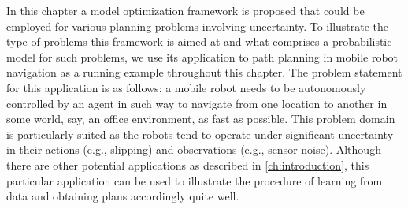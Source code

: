 
In this chapter a model optimization framework is proposed that could be employed for various planning problems involving uncertainty.
To illustrate the type of problems this framework is aimed at and what comprises a probabilistic model for such problems, we use its application to path planning in mobile robot navigation as a running example throughout this chapter.
The problem statement for this application is as follows: a mobile robot needs to be autonomously controlled by an agent in such way to navigate from one location to another in some world, say, an office environment, as fast as possible.
This problem domain is particularly suited as the robots tend to operate under significant uncertainty in their actions (e.g., slipping) and observations (e.g., sensor noise).
Although there are other potential applications as described in \autoref{ch:introduction}, this particular application can be used to illustrate the procedure of learning  from data and obtaining plans accordingly quite well.

